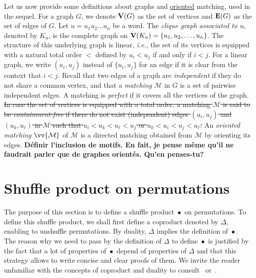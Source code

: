 \documentclass[a4paper]{llncs}
\DeclareMathOperator{\SHUFFLE}{\bullet}
\begin{document}
Let us now provide some definitions about graphs and \uline{oriented}
matching, used in the sequel.
For a graph $G$, we denote $\mathbf{V}(G)$ as the set of vertices
and $\mathbf{E}(G)$ as the set of edges of $G$. Let $u = u_1 u_2 \dots u_n$ be
a word. The \emph{clique graph associated to $u$}, denoted by $K_u$, is
the complete graph on $\mathbf{V}(K_u) = \{u_1, u_2, \ldots, u_n\}$. The
structure of this underlying graph is linear, \emph{i.e.}, the set of
its vertices is equipped with a natural total order $<$ defined by
$u_i < u_j$ if and only if $i < j$. For a linear graph, we write
$(u_i, u_j)$ instead of $\{u_i, u_j\}$ for an edge if it is clear from
the context that $i < j$. Recall that two edges of a graph are
\emph{independent} if they do not share a common vertex, and that a
\emph{matching} $\mathcal{M}$ in $G$ is a set of pairwise independent
edges. A matching is \emph{perfect} if it covers all the vertices of the
graph.
\sout{In case the set of vertices is equipped with a total order, a
matching $\mathcal{M}$ is said to be \emph{containment-free} if there do
not exist (independent) edges $(u_i, u_j)$ and $(u_k, u_\ell)$ in
$\mathcal{M}$ such that $u_i < u_k < u_\ell < u_j$ or
$u_k < u_i < u_j < u_\ell$.}
An \emph{oriented matching}
$\vv{\mathcal{M}}$ of $\mathcal{M}$ is a directed matching obtained
from $\mathcal{M}$ by orienting its edges.
\textbf{D\'efinir l'inclusion de motifs. En fait, je pense même qu'il ne faudrait
parler que de graphes orientés. Qu'en penses-tu?}



\section{Shuffle product on permutations}
\label{section:Shuffle product on permutations}

The purpose of this section is to define a shuffle product $\SHUFFLE$
on permutations. To define this shuffle product, we shall first define
a coproduct denoted by $\Delta$, enabling to unshuffle permutations.
By duality, $\Delta$ implies the definition of $\SHUFFLE$. The reason
why we need to pass by the definition of $\Delta$ to define $\SHUFFLE$
is justified by the fact that a lot of properties of $\SHUFFLE$ depend
of properties of $\Delta$ and that this strategy allows to write concise
and clear proofs of them. We invite the reader unfamiliar with the
concepts of coproduct and duality to consult~\cite{Joni:Rota:1979}
or~\cite{Grinberg:Reiner:2014}.
\medskip
\end{document}
